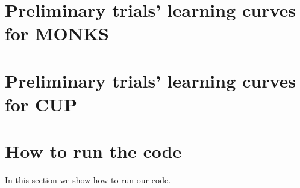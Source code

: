 \documentclass[11pt,twoside]{article}
\begin{document}
\begin{appendices}
    \section{Preliminary trials' learning curves for MONKS} %
    \label{sec:preliminary_trials_learning_curves}

    \section{Preliminary trials' learning curves for CUP} %
    \label{sec:preliminary_trials_learning_curves_for_cup}


    \section{How to run the code} %
    \label{sec:how_to_run_the_code}
        In this section we show how to run our code.

\end{appendices}

\end{document}
